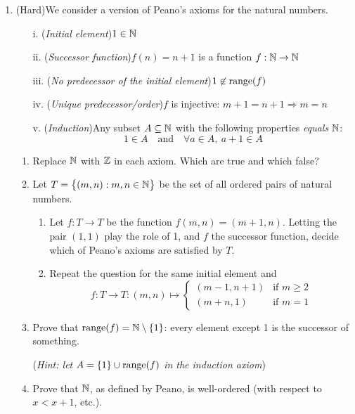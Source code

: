 \begin{exercises}
\begin{enumerate}
	
	  \item\label{exs:peano} (Hard)\lstsp We consider a version of Peano's axioms for the natural numbers.
		\begin{itemize}
			\item[i.] (\emph{Initial element})\lstsp $1\in\mathbb{N}$
			\item[ii.] (\emph{Successor function})\lstsp $f(n)=n+1$ is a function $f:\mathbb{N}\to\mathbb{N}$
			\item[iii.] (\emph{No predecessor of the initial element})\lstsp $1\not\in\operatorname{range}(f)$
			\item[iv.] (\emph{Unique predecessor/order})\lstsp $f$ is injective: $m+1=n+1\Longrightarrow m=n$
			\item[v.] (\emph{Induction})\lstsp Any subset $A\subseteq\mathbb{N}$ with the following properties \emph{equals} $\mathbb{N}$:
			\[
				1\in A\quad\text{and}\quad \forall a\in A,\ a+1\in A
			\]
		\end{itemize}
		\begin{enumerate}
			\item Replace $\mathbb{N}$ with $\mathbb{Z}$ in each axiom. Which are true and which false?
			\item Let $T=\bigl\{(m,n):m,n\in\mathbb{N}\bigr\}$ be the set of all ordered pairs of natural numbers.
			\begin{enumerate}
			  \item Let $f:T\to T$ be the function $f(m,n)=(m+1,n)$. Letting the pair $(1,1)$ play the role of 1, and $f$ the successor function, decide which of Peano's axioms are satisfied by $T$.
				\item Repeat the question for the same initial element and 
				\[
					f:T\to T:(m,n)\mapsto
					\begin{cases}
						(m-1,n+1)&\text{if }m\ge 2\\
						(m+n,1)&\text{if }m=1
					\end{cases}
				\]
			\end{enumerate}
			\item Prove that $\operatorname{range}(f)=\mathbb{N}\setminus\{1\}$: every element except 1 is the successor of something.\par
			(\emph{Hint: let $A=\{1\}\cup\operatorname{range}(f)$ in the induction axiom})
			\item Prove that $\mathbb{N}$, as defined by Peano, is well-ordered (with respect to $x<x+1$, etc.).
		\end{enumerate}
	

\end{enumerate}
\end{exercises}

